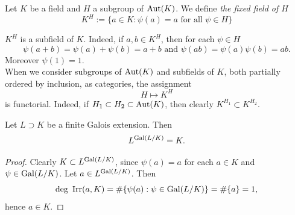     \begin{definition}
        Let $K$ be a field and $H$ a subgroup of $\mathrm{Aut}(K)$. We define \emph{the fixed field of $H$} 
        $$
            K^H := \{a\in K : \psi(a) = a \text{ for all } \psi\in H\}
        $$
    \end{definition}
    \begin{remark}
        $K^H$ is a subfield of $K$. Indeed, if $a,b\in K^H$, then for each $\psi\in H$ 
        $$
            \psi(a+b)=\psi(a)+\psi(b)=a+b \text{ and } \psi(ab) = \psi(a)\psi(b)=ab.
        $$
        Moreover $\psi(1)=1$.\\ When we consider subgroups of $\mathrm{Aut}(K)$ and subfields of $K$, both partially ordered by inclusion, as categories, the assignment 
        $$
            H\mapsto K^H
        $$
        is functorial. Indeed, if $H_1\subset H_2\subset \mathrm{Aut}(K)$, then clearly $K^{H_1}\subset K^{H_2}$.
    \end{remark}
    \begin{lemma}
        Let $L\supset K$ be a finite Galois extension. Then $$
            L^{\mathrm{Gal}(L/K)} = K.
        $$
    \end{lemma}
    \begin{proof}
        Clearly $K\subset L^{\mathrm{Gal}(L/K)}$, since $\psi(a)=a$ for each $a\in K$ and $\psi\in \mathrm{Gal}(L/K)$. Let $a\in L^{\mathrm{Gal}(L/K)}$. Then 
        $$
            \deg\ \mathrm{Irr}(a,K) = \#\{\psi(a) : \psi\in \mathrm{Gal}(L/K)\} = \#\{a\} = 1,
        $$
        hence $a\in K$. 
    \end{proof}
